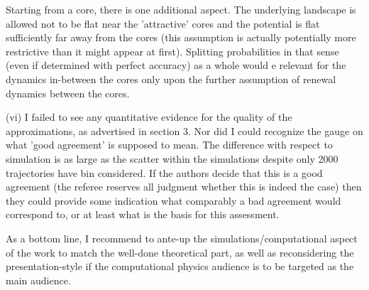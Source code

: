 \documentclass{article}
\begin{document}
Starting from a core, there is one additional aspect. The underlying
landscape is allowed not to be flat near the 'attractive' cores and
the potential is flat sufficiently far away from the cores (this
assumption is actually potentially more restrictive than it might
appear at first). Splitting probabilities in that sense (even if
determined with perfect accuracy) as a whole would e relevant for the
dynamics in-between the cores only upon the further assumption of
renewal dynamics between the cores.

(vi) I failed to see any quantitative evidence for the quality of the
approximations, as advertised in section 3. Nor did I could recognize
the gauge on what 'good agreement' is supposed to mean. The difference
with respect to simulation is as large as the scatter within the
simulations despite only 2000 trajectories have bin considered. If the
authors decide that this is a good agreement (the referee reserves all
judgment whether this is indeed the case) then they could provide some
indication what comparably a bad agreement would correspond to, or at
least what is the basis for this assessment.

As a bottom line, I recommend to ante-up the simulations/computational
aspect of the work to match the well-done theoretical part, as well as
reconsidering the presentation-style if the computational physics
audience is to be targeted as the main audience.
\end{document}
